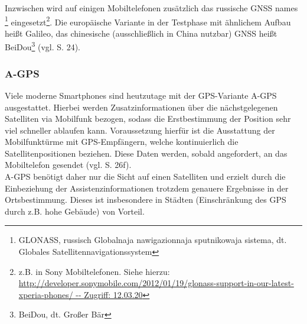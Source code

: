 Inzwischen wird auf einigen Mobiltelefonen zusätzlich das russische \gls{GNSS} names \footnote{ GLONASS, russisch Globalnaja nawigazionnaja sputnikowaja sistema, dt. Globales Satellitennavigationssystem} eingesetzt\footnote{ z.B. in Sony Mobiltelefonen. Siehe hierzu: \url{http://developer.sonymobile.com/2012/01/19/glonass-support-in-our-latest-xperia-phones/ -- Zugriff: 12.03.20}}.
Die europäische Variante in der Testphase mit ähnlichem Aufbau heißt Galileo, das chinesische (ausschließlich in China nutzbar) \gls{GNSS} heißt BeiDou\footnote{ BeiDou, dt. Großer Bär} (vgl. \cite{gps} S. 24).
\subsubsection{\gls{A-GPS}}
Viele moderne \glspl{Smartphone} sind heutzutage mit der \gls{GPS}-Variante \gls{A-GPS} ausgestattet. Hierbei werden Zusatzinformationen über die nächstgelegenen Satelliten via Mobilfunk bezogen, sodass die Erstbestimmung der Position sehr viel schneller ablaufen kann.
Voraussetzung hierfür ist die Ausstattung der Mobilfunktürme mit \gls{GPS}-Empfängern, welche kontinuierlich die Satellitenpositionen beziehen. Diese Daten werden, sobald angefordert, an das Mobiltelefon gesendet (vgl. \cite{gps} S. 26f). \\
\gls{A-GPS} benötigt daher nur die Sicht auf einen Satelliten und erzielt durch die Einbeziehung der Assistenzinformationen trotzdem genauere Ergebnisse in der Ortsbestimmung.
Dieses ist insbesondere in Städten (Einschränkung des \gls{GPS} durch z.B. hohe Gebäude) von Vorteil.
